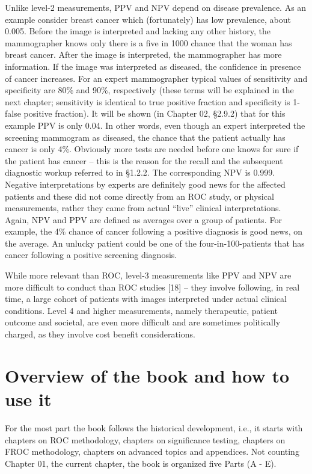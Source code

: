 \documentclass[
]{book}
\begin{document}
Unlike level-2 measurements, PPV and NPV depend on disease prevalence. As an example consider breast cancer which (fortunately) has low prevalence, about 0.005. Before the image is interpreted and lacking any other history, the mammographer knows only there is a five in 1000 chance that the woman has breast cancer. After the image is interpreted, the mammographer has more information. If the image was interpreted as diseased, the confidence in presence of cancer increases. For an expert mammographer typical values of sensitivity and specificity are 80\% and 90\%, respectively (these terms will be explained in the next chapter; sensitivity is identical to true positive fraction and specificity is 1-false positive fraction). It will be shown (in Chapter 02, §2.9.2) that for this example PPV is only 0.04. In other words, even though an expert interpreted the screening mammogram as diseased, the chance that the patient actually has cancer is only 4\%. Obviously more tests are needed before one knows for sure if the patient has cancer -- this is the reason for the recall and the subsequent diagnostic workup referred to in §1.2.2. The corresponding NPV is 0.999. Negative interpretations by experts are definitely good news for the affected patients and these did not come directly from an ROC study, or physical measurements, rather they came from actual ``live'' clinical interpretations. Again, NPV and PPV are defined as averages over a group of patients. For example, the 4\% chance of cancer following a positive diagnosis is good news, on the average. An unlucky patient could be one of the four-in-100-patients that has cancer following a positive screening diagnosis.

While more relevant than ROC, level-3 measurements like PPV and NPV are more difficult to conduct than ROC studies {[}18{]} -- they involve following, in real time, a large cohort of patients with images interpreted under actual clinical conditions. Level 4 and higher measurements, namely therapeutic, patient outcome and societal, are even more difficult and are sometimes politically charged, as they involve cost benefit considerations.

\hypertarget{overview-of-the-book-and-how-to-use-it}{%
\section{Overview of the book and how to use it}\label{overview-of-the-book-and-how-to-use-it}}

For the most part the book follows the historical development, i.e., it starts with chapters on ROC methodology, chapters on significance testing, chapters on FROC methodology, chapters on advanced topics and appendices. Not counting Chapter 01, the current chapter, the book is organized five Parts (A - E).
\end{document}
